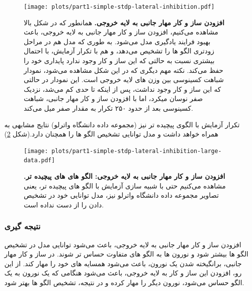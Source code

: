     \begin{figure}[!ht]
        \centering
        \texttt{[image: plots/part1-simple-stdp-lateral-inhibition.pdf]} 
        \captionsetup{width=.85\linewidth}
        \caption{\textbf{افزودن ساز و کار مهار جانبی به لایه خروجی. } 
        همانطور که در شکل بالا مشاهده می‌کنیم، افزودن ساز و کار مهار جانبی به لایه خروجی، باعث بهبود فرایند یادگیری مدل می‌شود. به طوری که مدل هم در مراحل زودتری الگو ها را تشخیص می‌دهد، و هم با تکرار آزمایش، با احتمال بیشتری نسبت به حالتی که این ساز و کار وجود ندارد پایداری خود را حفظ می‌کند. نکته مهم دیگری که در این شکل مشاهده می‌شود، نمودار شباهت کسینوسی بین وزن های لایه خروجی است. این نمودار در حالتی که این ساز و کار وجود نداشت، پس از اینکه تا حدی کم می‌شد، نزدیک صفر نوسان میکرد، اما با افزودن ساز و کار مهار جانبی، شباهت کسینوسی بعد از حدود ۲۵۰ تکرار به مقدار صفر میل می‌کند.
        }
        \label{fig:part1-simple-stdp-lateral-inhibition}
    \end{figure}

    تکرار آزمایش با الگوی پیچیده تر نیز 
    (مجموعه داده دانشگاه واترلو) 
    نتایج مشابهی به همراه خواهد داشت و مدل توانایی تشخیص الگو ها را همچنان دارد.(شکل \ref{fig:part1-simple-stdp-lateral-inhibition-large-data})

    \begin{figure}[!ht]
        \centering
        \texttt{[image: plots/part1-simple-stdp-lateral-inhibition-large-data.pdf]} 
        \captionsetup{width=.85\linewidth}
        \caption{\textbf{افزودن ساز و کار مهار جانبی به لایه خروجی: الگو های های پیچیده تر. } 
        مشاهده می‌کنیم حتی با شبیه سازی آزمایش با الگو های پیچیده تر، یعنی تصاویر مجموعه داده دانشگاه واترلو نیز، مدل توانایی خود در تشخیص دادن را از دست نداده است.
        }
        \label{fig:part1-simple-stdp-lateral-inhibition-large-data}
    \end{figure}

    \subsubsection*{نتیجه گیری}
        افزودن ساز و کار مهار جانبی به لایه خروجی، باعث می‌شود توانایی مدل در تشخیص الگو ها بیشتر شود و نورون ها به الگو های متفاوت حساس تر شوند. در ساز و کار مهار جانبی، برانگیخته شدن یک نورون، باعث می‌شود همسایه های خود را مهار کند. از این رو، افزودن این ساز و کار به لایه خروجی، باعث می‌شود هنگامی که یک نورون به یک الگو حساس می‌شود، نورون دیگر را مهار کرده و در نتیجه، تشخیص الگو ها بهتر شود.

